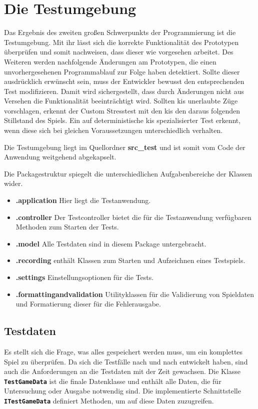 \documentclass[
							a4paper, 
							11pt, 
							openany, 
							liststotoc,
							parskip=half, 
   							headings=normal
						]{scrreprt}
\begin{document}
{\chapter{Die Testumgebung} \label{ch:testing}
Das Ergebnis des zweiten großen Schwerpunkts der Programmierung ist die Testumgebung. Mit ihr lässt sich die korrekte Funktionalität des Prototypen überprüfen und somit nachweisen, dass dieser wie vorgesehen arbeitet.\newline
Des Weiteren werden nachfolgende Änderungen am Prototypen, die einen unvorhergesehenen Programmablauf zur Folge haben detektiert. Sollte dieser ausdrücklich erwünscht sein, muss der Entwickler bewusst den entsprechenden Test modifizieren. Damit wird sichergestellt, dass durch Änderungen nicht aus Versehen die Funktionalität beeinträchtigt wird. Sollten \acs{ki}s unerlaubte Züge vorschlagen, erkennt der Custom Stresstest mit den \acs{ki}s den daraus folgenden Stillstand des Spiels. Ein auf deterministische \acs{ki}s spezialisierter Test erkennt, wenn diese sich bei gleichen Voraussetzungen unterschiedlich verhalten.

Die Testumgebung liegt im Quellordner \textbf{src\_test} und ist somit vom Code der Anwendung weitgehend abgekapselt.

Die Packagestruktur spiegelt die unterschiedlichen Aufgabenbereiche der Klassen wider.
\begin{itemize}
	 \item \textbf{.application} Hier liegt die Testanwendung.
	 \item \textbf{.controller} Der Testcontroller bietet die für die Testanwendung verfügbaren Methoden zum Starten der Tests.
 	 \item \textbf{.model} Alle Testdaten sind in diesem Package untergebracht.
 	 \item \textbf{.recording} enthält Klassen zum Starten und Aufzeichnen eines Testspiels.
 	 \item \textbf{.settings} Einstellungsoptionen für die Tests.
 	 \item \textbf{.formattingandvalidation} Utilityklassen für die Validierung von Spieldaten und Formatierung dieser für die Fehlerausgabe.
\end{itemize}

\clearpage

\section{Testdaten} \label{se:testing_data}
Es stellt sich die Frage, was alles gespeichert werden muss, um ein komplettes Spiel zu überprüfen. Da sich die Testfälle nach und nach entwickelt haben, sind auch die Anforderungen an die Testdaten mit der Zeit gewachsen. \newline
Die Klasse \textbf{\texttt{TestGameData}} ist die finale Datenklasse und enthält alle Daten, die für Untersuchung oder Ausgabe notwendig sind. Die implementierte Schnittstelle \textbf{\texttt{ITest\-Ga\-me\-Da\-ta}} definiert Methoden, um auf diese Daten zuzugreifen.

}
\end{document}
